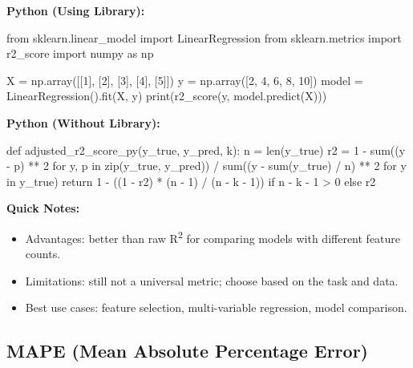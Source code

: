\documentclass[11pt,a4paper]{article}
\newcommand{\pyheading}[1]{%
\vspace{2\baselineskip}
\noindent\textbf{#1}
}
\begin{document}

\pyheading{Python (Using Library):}

\begin{py}
from sklearn.linear_model import LinearRegression
from sklearn.metrics import r2_score
import numpy as np

X = np.array([[1], [2], [3], [4], [5]])
y = np.array([2, 4, 6, 8, 10])
model = LinearRegression().fit(X, y)
print(r2_score(y, model.predict(X)))
\end{py}

\pyheading{Python (Without Library):}

\begin{py}
def adjusted_r2_score_py(y_true, y_pred, k):
    n = len(y_true)
    r2 = 1 - sum((y - p) ** 2 for y, p in zip(y_true, y_pred)) / sum((y - sum(y_true) / n) ** 2 for y in y_true)
    return 1 - ((1 - r2) * (n - 1) / (n - k - 1)) if n - k - 1 > 0 else r2
\end{py}

\pyheading{Quick Notes:}
\begin{itemize}
\item Advantages: better than raw R\textsuperscript{2} for comparing models with different feature counts.
\item Limitations: still not a universal metric; choose based on the task and data.
\item Best use cases: feature selection, multi-variable regression, model comparison.
\end{itemize}

\subsection{MAPE (Mean Absolute Percentage Error)}




\end{document}
